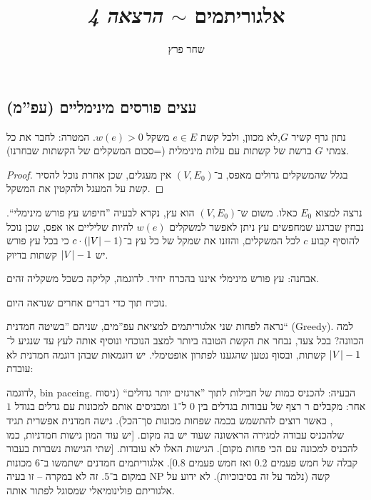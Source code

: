 \documentclass[]{../../../../tex/classes/styledArticle}
\author{שחר פרץ}
\title{אלגוריתמים $\sim$ \textit{הרצאה 4}}
\begin{document}
	\maketitle
	\subsection*{עצים פורסים מינימליים (עפ''מ)}
	נתון גרף קשיר $G$,לא מכוון, ולכל קשת $e \in E$ משקל $w(e) > 0$. המטרה: לחבר את כל צמתי $G$ ברשת של קשתות עם עלות מינימלית (=סכום המשקלים של הקשתות שבחרנו). 
	\begin{proof}
		בגלל שהמשקלים גדולים מאפס, ב־$(V, E_0)$  אין מעגלים, שכן אחרת נוכל להסיר קשת על המעגל ולהקטין את המשקל. 
	\end{proof}
	נרצה למצוא $E_0$ כאלו. משום ש־$(V, E_0)$ הוא עץ, נקרא לבעיה ''חיפוש עץ פורש מינימלי``. נבחין שברגע שמחפשים עץ ניתן לאפשר למשקלים $w(e)$ להיות שליליים או אפס, שכן נוכל להוסיף קבוע $c$ לכל המשקלים, והזזנו את שמקל של כל עץ ב־$c \cdot (\left \lvert V \right \rvert - 1)$ כי בכל עץ פורש יש $\left \lvert V \right \rvert - 1$ קשתות בדיוק. 
	
	אבחנה: עץ פורש מינימלי איננו בהכרח יחיד. לדוגמה, קליקה כשכל משקליה זהים. 
	
	נוכיח תוך כדי דברים אחרים שנראה היום. 
	
	נראה לפחות שני אלגוריתמים למציאת עפ''מים, שניהם ''בשיטה חמדנית`` (Greedy). למה הכוונה? בכל צעד, נבחר את הקשת הטובה ביותר למצב הנוכחי ונוסיף אותה לעץ עד שנגיע ל־$\left \lvert V \right \rvert - 1$ קשתות, ובסוף נטען שהגענו לפתרון אופטימלי. יש דוגמאות שבהן דוגמה חמדנית לא עובדת: 
	
	לדוגמה, bin paceing. הבעיה: להכניס כמות של חבילות לתוך ''ארגזים יותר גדולים`` (ניסוח אחר: מקבלים ר רצף של עבודות בגדלים בין $0$ ל־$1$ ומכניסים אותם למכונות עם גדלים בגודל $1$, כאשר רוצים להתשמש בכמה שפחות מכונות סך־הכל). גישה חמדנית אפשרית תגיד שלהכניס עבודה למגירה הראשונה שעוד יש בה מקום. [יש עוד המון גישות חמדניות, כמו להכניס למכונה עם הכי פחות מקום]. הגישות האלו לא עובדות. [שתי הגישות נשברות בעבור קבלה של חמש פעמים 0.2 ואז חמש פעמים 0.8]. אלגוריתמים חמדנים ישתמשו ב־6 מכונות במקום ב־5. זה לא במקרה – זו בעיה NP קשה (נלמד על זה בסיבוכיות). לא ידוע על אלגוריתם פולינומיאלי שמסוגל לפתור אותה. 
	
\end{document}
